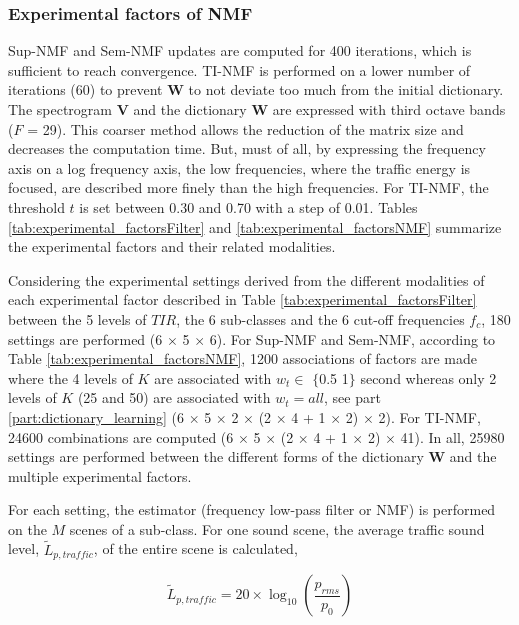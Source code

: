 \documentclass[twocolumn,a4paper,10pt]{article}
\begin{document}
\subsubsection{Experimental factors of NMF}

Sup-NMF and Sem-NMF updates are computed for 400 iterations, which is sufficient to reach convergence. TI-NMF is performed on a lower number of iterations (60) to prevent $\mathbf{W}$ to not deviate too much from the initial dictionary.
The spectrogram $\mathbf{V}$ and the dictionary $\mathbf{W}$ are expressed with third octave bands ($F$ = 29). This coarser method allows the reduction of the matrix size and decreases the computation time. But,  must of all, by expressing the frequency axis on a log frequency axis,  the low frequencies, where the traffic energy is focused, are described more finely than the high frequencies. For TI-NMF, the threshold $t$ is set between 0.30 and 0.70 with a step of 0.01. Tables  \ref{tab:experimental_factorsFilter} and \ref{tab:experimental_factorsNMF} summarize the experimental factors and their related modalities.

Considering the experimental settings derived from the different modalities of each experimental factor described in Table \ref{tab:experimental_factorsFilter}  between the 5 levels of $TIR$, the 6 sub-classes and the 6 cut-off frequencies $f_c$, 180 settings are performed (6 $\times$ 5 $\times$ 6). For Sup-NMF and Sem-NMF, according to Table \ref{tab:experimental_factorsNMF},  1200 associations of factors are made where the 4 levels of $K$ are associated with $w_t \in$ $\lbrace$0.5 1$\rbrace$ second whereas only 2 levels of $K$ (25 and 50) are associated with $w_t = all$, see part \ref{part:dictionary_learning} (6 $\times$ 5 $\times$ 2 $\times$ (2 $\times$ 4 + 1 $\times$ 2) $\times$ 2). For TI-NMF, 24600 combinations are computed (6 $\times$ 5 $\times$ (2 $\times$ 4 + 1 $\times$ 2) $\times$ 41). In all, 25980 settings are performed between the different forms of the dictionary $\mathbf{W}$ and the multiple experimental factors.

For each setting, the estimator (frequency low-pass filter or NMF) is performed on the $M$ scenes of a sub-class. For one sound scene, the average traffic sound level, $\tilde{L}_{p,traffic}$, of the entire scene is calculated,

\begin{equation}
\tilde{L}_{p,traffic} = 20 \times \log_{10}\left(\frac{p_{rms}}{p_0}\right)
\end{equation}
\end{document}
